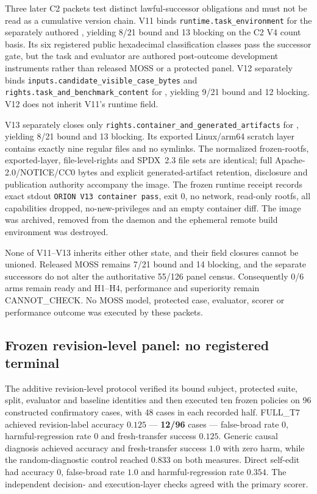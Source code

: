 Three later C2 packets test distinct lawful-successor obligations and must not
be read as a cumulative version chain. V11 binds
\texttt{runtime.task\_environment} for the separately authored
, yielding 8/21 bound
and 13 blocking on the C2 V4 count basis. Its six registered public hexadecimal
classification classes pass the successor gate, but the task and evaluator are
authored post-outcome development instruments rather than released MOSS or a
protected panel. V12 separately binds
\texttt{inputs.candidate\_visible\_case\_bytes} and
\texttt{rights.task\_and\_benchmark\_content} for
, yielding
9/21 bound and 12 blocking. V12 does not inherit V11's runtime field.

V13 separately closes only
\texttt{rights.container\_and\_generated\_artifacts} for
, yielding
8/21 bound and 13 blocking. Its exported Linux/arm64 scratch layer contains
exactly nine regular files and no symlinks. The normalized frozen-rootfs,
exported-layer, file-level-rights and SPDX~2.3 file sets are identical; full
Apache-2.0/NOTICE/CC0 bytes and explicit generated-artifact retention,
disclosure and publication authority accompany the image. The frozen runtime
receipt records exact stdout \texttt{ORION V13 container pass\string\n}, exit 0, no
network, read-only rootfs, all capabilities dropped, no-new-privileges and an
empty container diff. The image was archived, removed from the daemon and the
ephemeral remote build environment was destroyed.

None of V11--V13 inherits either other state, and their field closures cannot
be unioned. Released MOSS remains 7/21 bound and 14 blocking, and the separate
successors do not alter the authoritative 55/126 panel census. Consequently
0/6 arms remain ready and H1--H4, performance and superiority remain
\textsf{CANNOT\_CHECK}. No MOSS model, protected case, evaluator, scorer or
performance outcome was executed by these packets.

\subsection*{Frozen revision-level panel: no registered terminal}

The additive revision-level protocol verified its bound subject, protected
suite, split, evaluator and baseline identities and then executed ten frozen
policies on 96 constructed confirmatory cases, with 48 cases in each recorded
half. FULL\_T7 achieved revision-label accuracy $0.125$ --- \textbf{12/96}
cases --- false-broad rate
$0$, harmful-regression rate $0$ and fresh-transfer success $0.125$. Generic
causal diagnosis achieved accuracy and fresh-transfer success $1.0$ with zero
harm, while the random-diagnostic control reached $0.833$ on both measures.
Direct self-edit had accuracy $0$, false-broad rate $1.0$ and harmful-regression
rate $0.354$. The independent decision- and execution-layer checks agreed with
the primary scorer.

